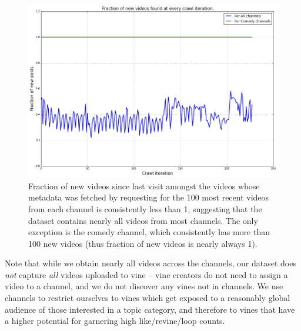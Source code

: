   
\begin{figure}[htb]
  \includegraphics[width=0.9\columnwidth]{plots/UniquePostDownload}
  \caption{Fraction of new videos since last visit amongst the videos whose metadata was fetched by requesting for the 100 most recent videos from each channel is consistently less than 1, suggesting that the dataset contains nearly all videos from most channels. The only exception is the comedy channel, which consistently has more than 100 new videos (thus fraction of new videos is nearly always 1).}
  \label{fig:download-fraction}
\end{figure}

Note that while we obtain nearly all videos across the channels, our dataset does \emph{not} capture  \emph{all} videos uploaded to vine -- vine creators do not need to assign a video to a channel, and we do not discover any vines not in channels. We use channels to restrict ourselves to vines which get exposed to a reasonably global audience of those interested in a topic category, and therefore to vines that have a higher potential for garnering high like/revine/loop counts. 



%
% 

